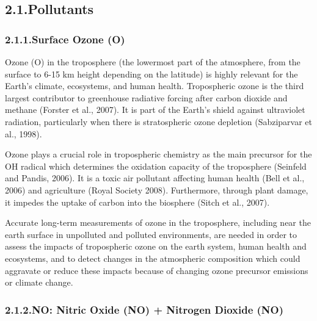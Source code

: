 \documentclass[9pt]{report}
\begin{document}
\subsection{2.1.\hspace*{0.5em}Pollutants}\label{sec-pollutants}%

\subsubsection{2.1.1.\hspace*{0.5em}Surface Ozone (O)}\label{sec-surface-ozone-o3}%

\noindent{}Ozone (O) in the troposphere (the lowermost part of the atmosphere, from the surface to 6-15 km height depending on the latitude) is highly relevant for the Earth’s climate, ecosystems, and human health.
Tropospheric ozone is the third largest contributor to greenhouse radiative forcing after carbon dioxide and methane (Forster et al., 2007).
It is part of the Earth’s shield against ultraviolet radiation, particularly when there is stratospheric ozone depletion (Sabziparvar et al., 1998).%

Ozone plays a crucial role in tropospheric chemistry as the main precursor for the OH radical which determines the oxidation capacity of the troposphere (Seinfeld and Pandis, 2006). 
It is a toxic air pollutant affecting human health (Bell et al., 2006) and agriculture (Royal Society 2008).
Furthermore, through plant damage, it impedes the uptake of carbon into the biosphere (Sitch et al., 2007).%

Accurate long-term measurements of ozone in the troposphere, including near the earth surface in unpolluted and polluted environments, are needed in order to assess the impacts of tropospheric ozone on the earth system, human health and ecosystems, and to detect changes in the atmospheric composition which could aggravate or reduce these impacts because of changing ozone precursor emissions or climate change.%

\subsubsection{2.1.2.\hspace*{0.5em}NO: Nitric Oxide (NO) + Nitrogen Dioxide (NO)}\label{sec-nox--nitric-oxide-no-nitrogen-dioxide-no2}%
\end{document}

